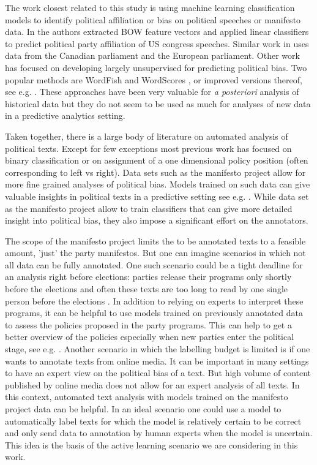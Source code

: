 \documentclass[runningheads,a4paper]{article}
\begin{document}
The work closest related to this study is using machine learning classification models to identify political affiliation or bias on political speeches or manifesto data. In \cite{Yu2008} the authors extracted BOW feature vectors and applied linear classifiers to predict political party affiliation of US congress speeches. Similar work in \cite{Hirst2014} uses data from the Canadian parliament and the European parliament. 
Other work has focused on developing largely unsupervised for predicting political bias. Two popular methods are WordFish \cite{Slapin08ascaling} and WordScores \cite{Laver2003}, or improved versions thereof, see e.g. \cite{Lowe09scalingpolicy}. These approaches have been very valuable for {\em a posteriori} analysis of historical data but they do not seem to be used as much for analyses of new data in a predictive analytics setting. 

Taken together, there is a large body of literature on automated analysis of political texts. Except for few exceptions most previous work has focused on binary classification or on assignment of a one dimensional policy position (often corresponding to left vs right). Data sets such as the manifesto project allow for more fine grained analyses of political bias. Models trained on such data can give valuable insights in political texts in a predictive setting see e.g. \cite{Merz2016,Biessmann16}. While data set as the manifesto project allow to train classifiers that can give more detailed insight into political bias, they also impose a significant effort on the annotators. 

The scope of the manifesto project limits the to be annotated texts to a feasible amount, 'just' the party manifestos. But one can imagine scenarios in which not all data can be fully annotated. One such scenario could be a tight deadline for an analysis right before elections: parties release their programs only shortly before the elections and often these texts are too long to read by one single person before the elections \cite{merz2017}. In addition to relying on experts to interpret these programs, it can be helpful to use models trained on previously annotated data to assess the policies proposed in the party programs. This can help to get a better overview of the policies especially when new parties enter the political stage, see e.g. \cite{bronline}. 
Another scenario in which the labelling budget is limited is if one wants to annotate texts from online media. It can be important in many settings to have an expert view on the political bias of a text. But high volume of content published by online media does not allow for an expert analysis of all texts. In this context, automated text analysis with models trained on the manifesto project data can be helpful. In an ideal scenario one could use a model to automatically label texts for which the model is relatively certain to be correct and only send data to annotation by human experts when the model is uncertain. This idea is the basis of the active learning scenario we are considering in this work. 
\end{document}
